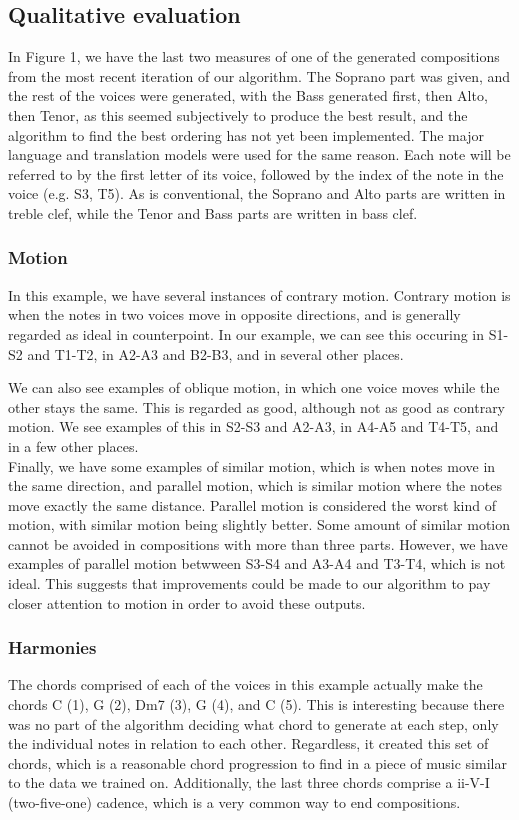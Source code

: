 \documentclass{sig-alternate}
\begin{document}
\subsection{Qualitative evaluation}
In Figure 1, we have the last two measures of one of the generated compositions from the most recent iteration of our algorithm. The Soprano part was given, and the rest of the voices were generated, with the Bass generated first, then Alto, then Tenor, as this seemed subjectively to produce the best result, and the algorithm to find the best ordering has not yet been implemented. The major language and translation models were used for the same reason. Each note will be referred to by the first letter of its voice, followed by the index of the note in the voice (e.g. S3, T5). As is conventional, the Soprano and Alto parts are written in treble clef, while the Tenor and Bass parts are written in bass clef.

\subsubsection{Motion}

In this example, we have several instances of contrary motion. Contrary motion is when the notes in two voices move in opposite directions, and is generally regarded as ideal in counterpoint. In our example, we can see this occuring in S1-S2 and T1-T2, in A2-A3 and B2-B3, and in several other places.

We can also see examples of oblique motion, in which one voice moves while the other stays the same. This is regarded as good, although not as good as contrary motion. We see examples of this in S2-S3 and A2-A3, in A4-A5 and T4-T5, and in a few other places.\\
Finally, we have some examples of similar motion, which is when notes move in the same direction, and parallel motion, which is similar motion where the notes move exactly the same distance. Parallel motion is considered the worst kind of motion, with similar motion being slightly better. Some amount of similar motion cannot be avoided in compositions with more than three parts. However, we have examples of parallel motion betwween S3-S4 and A3-A4 and T3-T4, which is not ideal. This suggests that improvements could be made to our algorithm to pay closer attention to motion in order to avoid these outputs.

\subsubsection{Harmonies}
The chords comprised of each of the voices in this example actually make the chords C (1), G (2), Dm7 (3), G (4), and C (5). This is interesting because there was no part of the algorithm deciding what chord to generate at each step, only the individual notes in relation to each other. Regardless, it created this set of chords, which is a reasonable chord progression to find in a piece of music similar to the data we trained on. Additionally, the last three chords comprise a ii-V-I (two-five-one) cadence, which is a very common way to end compositions.
\end{document}
